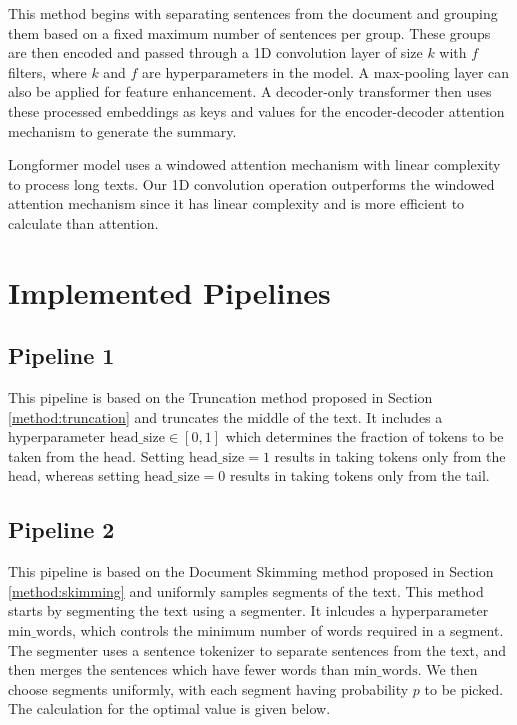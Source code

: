 This method begins with separating sentences from the document and grouping them
based on a fixed maximum number of sentences per group.
These groups are then encoded and passed through a 1D convolution layer of size $k$ with
$f$ filters, where $k$ and $f$ are hyperparameters in the model.
A max-pooling layer can also be applied for feature enhancement.
A decoder-only transformer then uses these processed embeddings as keys and values
for the encoder-decoder attention mechanism to generate the summary.

Longformer model \cite{beltagy2020longformer} uses a windowed attention mechanism with
linear complexity to process long texts.
Our 1D convolution operation outperforms the windowed attention mechanism since it has
linear complexity and is more efficient to calculate than attention.


\section{Implemented Pipelines}


\subsection*{Pipeline 1}

This pipeline is based on the Truncation method proposed in Section \ref{method:truncation}
and truncates the middle of the text.
It includes a hyperparameter $\mathrm{head\_size} \in [0, 1]$ which determines the fraction
of tokens to be taken from the head.
Setting $\mathrm{head\_size} = 1$ results in taking tokens only from the head, whereas
setting $\mathrm{head\_size} = 0$ results in taking tokens only from the tail.


\subsection*{Pipeline 2}

This pipeline is based on the Document Skimming method proposed in Section \ref{method:skimming}
and uniformly samples segments of the text.
This method starts by segmenting the text using a segmenter.
It inlcudes a hyperparameter $\mathrm{min\_words}$, which controls the minimum number of
words required in a segment.
The segmenter uses a sentence tokenizer to separate sentences from the text, and then
merges the sentences which have fewer words than $\mathrm{min\_words}$.
We then choose segments uniformly, with each segment having probability $p$ to be picked.
The calculation for the optimal value is given below.


